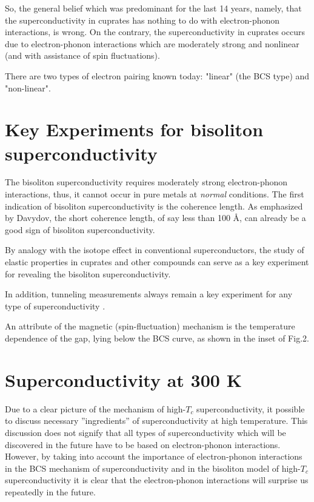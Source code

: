 So, the general belief which was predominant for the last 14 years, 
namely, that the superconductivity in cuprates has nothing to do with 
electron-phonon interactions, is wrong. On the contrary, the 
superconductivity in cuprates occurs due to electron-phonon interactions 
which are moderately strong and nonlinear (and with assistance of spin 
fluctuations).

There are two types of electron pairing known today: "linear" (the BCS type) 
and "non-linear".

\section{Key Experiments for bisoliton superconductivity}

The bisoliton superconductivity requires moderately strong electron-phonon 
interactions, thus, it cannot occur in pure metals at {\em normal} conditions.
The first indication of bisoliton superconductivity is the coherence length. 
As emphasized by Davydov, the short coherence length, of say less than 
100 \AA, can already be a good sign of bisoliton superconductivity. 

By analogy with the isotope effect in conventional superconductors, the 
study of elastic properties in cuprates and other compounds can serve as 
a key experiment for revealing the bisoliton superconductivity. 

In addition, tunneling measurements always remain a key 
experiment for any type of superconductivity \cite{AMour2,Eric}. 

An attribute of the magnetic (spin-fluctuation) mechanism is the 
temperature dependence of the gap, lying below the BCS curve, as shown 
in the inset of Fig.2.

\section{Superconductivity at 300 K}

Due to a clear picture of the mechanism of high-$T_{c}$ 
superconductivity, it possible to discuss necessary ''ingredients'' of
superconductivity at high temperature. This discussion does not 
signify that all types of superconductivity which will be discovered in 
the future have to be based on electron-phonon interactions. However, by 
taking into account the importance of electron-phonon interactions in the 
BCS mechanism of superconductivity and in the bisoliton model of 
high-$T_{c}$ superconductivity it is clear that the electron-phonon 
interactions will surprise us repeatedly in the future.

